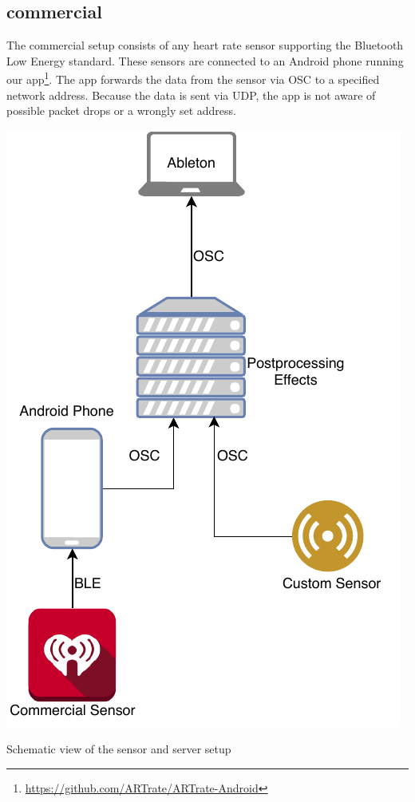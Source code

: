 \documentclass{sigchi-ext}
\begin{document}
\subsection{commercial}

The commercial setup consists of any heart rate sensor supporting the Bluetooth Low Energy
standard. These sensors are connected to an Android phone running our app\footnote{\url{https://github.com/ARTrate/ARTrate-Android}}.
The app forwards the data from the sensor via OSC to a specified network address.
Because the data is sent via UDP, the app is not aware of possible packet drops or a wrongly set address.

\begin{marginfigure}[-46pc]
  \begin{minipage}{\marginparwidth}
    \centering
    \includegraphics[width=0.9\marginparwidth]{figures/topology}
    \caption{Schematic view of the sensor and server setup}
    \label{fig:setup}
  \end{minipage}
\end{marginfigure}
\end{document}
